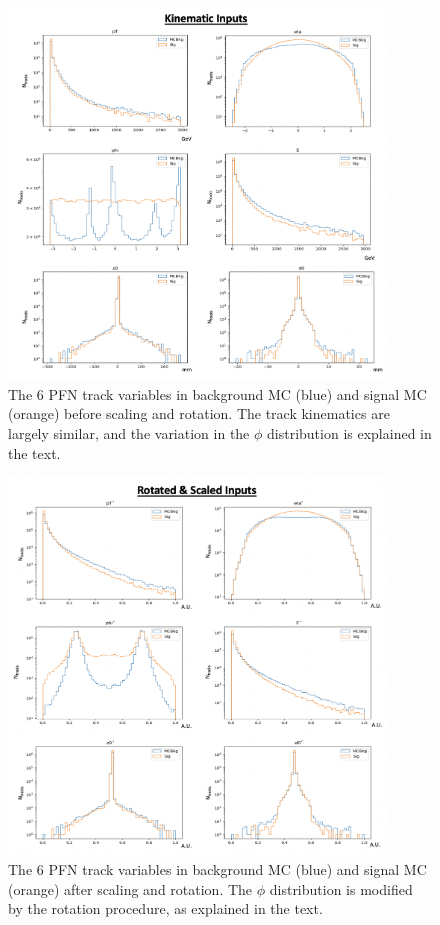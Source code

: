 \begin{figure}[!htbp]
    \centering
     \includegraphics[width=0.9\textwidth]{figures/ml/pfn_bkgsig_input_kin}
     \caption{The 6 PFN track variables in background MC (blue) and signal MC (orange) before scaling and rotation. The track kinematics are largely similar, and the variation in the $\phi$ distribution is explained in the text.}
      \label{fig:pfn_bkgsig_input_kin}
\end{figure}

\begin{figure}[!htbp]
    \centering
    \includegraphics[width=0.9\textwidth]{figures/ml/pfn_bkgsig_input_rot}
     \caption{The 6 PFN track variables in background MC (blue) and signal MC (orange) after scaling and rotation. The $\phi$ distribution is modified by the rotation procedure, as explained in the text.}
     \label{fig:pfn_bkgsig_input_rot}
\end{figure}

